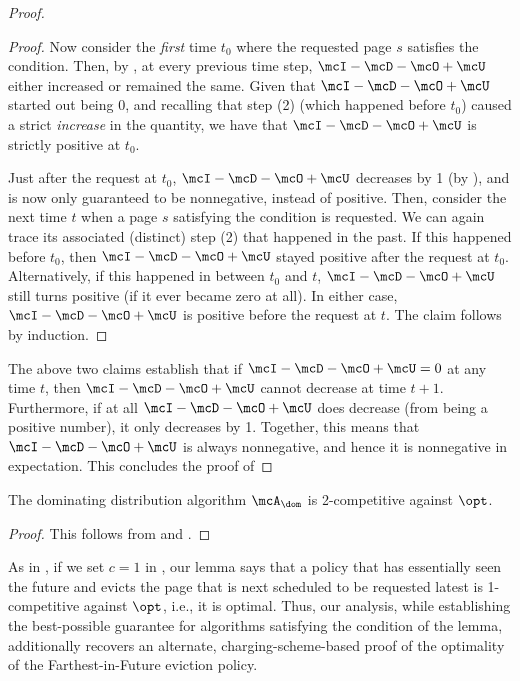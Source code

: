 \documentclass[11pt]{article}
\begin{document}
\begin{proof}
\begin{proof}
        Now consider the \textit{first} time $t_0$ where the requested page $s$ satisfies the condition. Then, by , at every previous time step, $\mcI - \mcD - \mcO + \mcU$ either increased or remained the same. Given that $\mcI - \mcD - \mcO + \mcU$ started out being 0, and recalling that step (2) (which happened before $t_0$) caused a strict \textit{increase} in the quantity, we have that $\mcI - \mcD - \mcO + \mcU$ is strictly positive at $t_0$.

        Just after the request at $t_0$, $\mcI - \mcD - \mcO + \mcU$ decreases by 1 (by ), and is now only guaranteed to be nonnegative, instead of positive. Then, consider the next time $t$ when a page $s$ satisfying the condition is requested. We can again trace its associated (distinct) step (2) that happened in the past. If this happened before $t_0$, then $\mcI - \mcD - \mcO + \mcU$ stayed positive after the request at $t_0$. Alternatively, if this happened in between $t_0$ and $t$, $\mcI - \mcD - \mcO + \mcU$ still turns positive (if it ever became zero at all). In either case, $\mcI - \mcD - \mcO + \mcU$ is positive before the request at $t$. The claim follows by induction.
    \end{proof}

    The above two claims establish that if $\mcI - \mcD - \mcO + \mcU=0$ at any time $t$, then $\mcI - \mcD - \mcO + \mcU$ cannot decrease at time $t+1$. Furthermore, if at all $\mcI - \mcD - \mcO + \mcU$ does decrease (from being a positive number), it only decreases by 1. Together, this means that $\mcI - \mcD - \mcO + \mcU$ is always nonnegative, and hence it is nonnegative in expectation. This concludes the proof of 
\end{proof}

\begin{corollary}
    \label{corollary:dom-is-2-competitive}
    The dominating distribution algorithm $\mcA_\dom$ is 2-competitive against $\opt$.
\end{corollary}
\begin{proof}
    This follows from  and .
\end{proof}

\begin{remark}
    \label{remark:optimal-fifo}
    As in , if we set $c=1$ in , our lemma says that a policy that has essentially seen the future and evicts the page that is next scheduled to be requested latest is 1-competitive against $\opt$, i.e., it is optimal. Thus, our analysis, while establishing the best-possible guarantee for algorithms satisfying the condition of the lemma, additionally recovers an alternate, charging-scheme-based proof of the optimality of the Farthest-in-Future eviction policy.
\end{remark}
\end{document}
